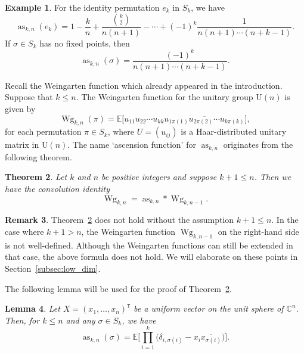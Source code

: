 \documentclass[pdftex]{sigma}
\numberwithin{equation}{section}
\newtheorem{Theorem}{Theorem}[section]
\newtheorem{Lemma}[Theorem]{Lemma}
\theoremstyle{definition}
\newtheorem{Example}[Theorem]{Example}
\newtheorem{Remark}[Theorem]{Remark}
\newcommand{\UU}{\mathrm{U}}
\newcommand{\trans}[1]{#1^{\mathtt{T}}}
\DeclareMathOperator{\Raise}{as}
\DeclareMathOperator{\Wg}{Wg}
\begin{document}
\begin{Example}
For the identity permutation $e_k$ in $S_k$, we have
\[
\Raise_{k,n}(e_k)
= 1-\frac{k}{n} + \frac{\binom{k}{2}}{n(n+1)} - \cdots +(-1)^k \frac{1}{n(n+1) \cdots(n+k-1)}.
\]
If $\sigma \in S_k$ has no fixed points, then
\[
\Raise_{k,n}(\sigma)= \frac{(-1)^k}{n(n+1) \cdots (n+k-1)}.
\]
\end{Example}


Recall the Weingarten function which already appeared in the introduction. Suppose that $k \le n$.
The Weingarten function for the unitary group $\UU(n)$ is given by
\[
\Wg_{k,n}(\pi) = \mathbb{E}\bigl[ u_{11} u_{22} \cdots u_{kk}
\overline{u_{1\pi(1)} u_{2\pi(2)} \cdots u_{k\pi(k)}}\bigr],
\]
for each permutation $\pi\in S_k$,
where $U=(u_{ij})$ is a Haar-distributed unitary matrix in $\UU(n)$.
The name `ascension function' for $\Raise_{k,n}$ originates from the following theorem.

\begin{Theorem} \label{thm:recursive}
Let $k$ and $n$ be positive integers and suppose $k+1 \le n$.
Then we have the convolution identity
\[
\Wg_{k,n} =\Raise_{k,n} * \Wg_{k,n-1}.
\]
\end{Theorem}

\begin{Remark}
Theorem~\ref{thm:recursive} does not hold without the assumption $k+1 \le n$. In the case where $k+1 > n$, the Weingarten function $\Wg_{k,n-1}$ on the right-hand side is not well-defined. %
Although the Weingarten functions can still be extended in that case, the above formula does not hold.
We will elaborate on these points in Section~\ref{subsec:low_dim}.
\end{Remark}

The following lemma will be used for the proof of Theorem~\ref{thm:recursive}.

\begin{Lemma} \label{lem:expression_A}
Let $X=\trans{(x_1,\dots,x_n)}$ be a uniform vector on the unit sphere of $\mathbb{C}^n$.
Then, for $k \le n$ and any $\sigma \in S_k$, we have
\[
\Raise_{k,n}(\sigma)=\mathbb{E} \Biggl[
\prod_{i=1}^k \bigl( \delta_{i,\sigma(i)} - x_i \overline{x_{\sigma(i)}} \bigr) \Biggr].
\]
\end{Lemma}
\end{document}
